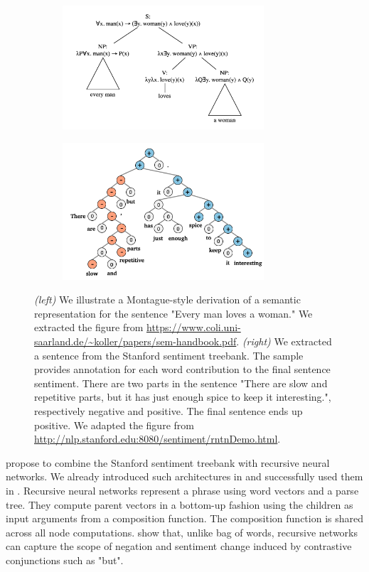 \begin{figure}[htb!]
    \centering
    \begin{subfigure}[b]{8cm}
        \centering
        \includegraphics[width=7.5cm]{images/lambda_form.png}
    \end{subfigure}
    \hfill
    \begin{subfigure}[b]{8cm}  
        \centering 
        \includegraphics[width=7.5cm]{images/socher-tree-5.png}
\end{subfigure}
\caption{\textit{(left)} We illustrate a Montague-style \parencite{montague_1973} derivation of a semantic representation for the sentence "Every man loves a woman." We extracted the figure from \url{https://www.coli.uni-saarland.de/~koller/papers/sem-handbook.pdf}. \textit{(right)} We extracted a sentence from the Stanford sentiment treebank. The sample provides annotation for each word contribution to the final sentence sentiment. There are two parts in the sentence "There are slow and repetitive parts, but it has just enough spice to keep it interesting.", respectively negative and positive. The final sentence ends up positive. We adapted the figure from \url{http://nlp.stanford.edu:8080/sentiment/rntnDemo.html}.}
\end{figure}

\textcite{socher_13} propose to combine the Stanford sentiment treebank with recursive neural networks. We already introduced such architectures in  and successfully used them in . Recursive neural networks represent a phrase using word vectors and a parse tree. They compute parent vectors in a bottom-up fashion using the children as input arguments from a composition function. The composition function is shared across all node computations. \textcite{socher_13} show that, unlike bag of words, recursive networks can capture the scope of negation and sentiment change induced by contrastive conjunctions such as "but".

